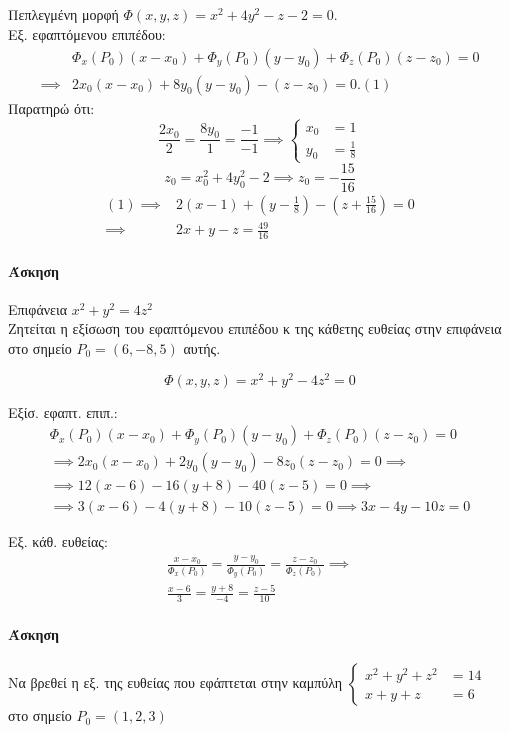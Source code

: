 \documentclass[11pt,a4paper,titlepage,draft]{article}
\begin{document}
\subparagraph{}
Πεπλεγμένη μορφή \( \Phi(x,y,z)=x^2+4y^2-z-2=0 \).\\
Εξ. εφαπτόμενου επιπέδου:
\begin{align*}
 & \Phi_x(P_0)(x-x_0)+\Phi_y(P_0)(y-y_0)+\Phi_z(P_0)(z-z_0) =0  \\
\implies & 2x_0(x-x_0) + 8y_0(y-y_0)-(z-z_0) = 0. (1)
\end{align*}
Παρατηρώ ότι: \[
\frac{2x_0}{2} = \frac{8y_0}{1} = \frac{-1}{-1} \implies \begin{cases}
x_0 &=1 \\ y_0 &= \frac{1}{8}
\end{cases}
\]
\[
z_0=x_0^2+4y_0^2-2 \implies z_0 = -\frac{15}{16}
\]
\begin{align*}
(1) \implies & 2(x-1)+\left( y-\frac{1}{8} \right) - \left(z+\frac{15}{16} \right) =0 \\
\implies & 2x+y-z=\frac{49}{16}
\end{align*}

\paragraph{Άσκηση}
Επιφάνεια \( x^2+y^2=4z^2 \)\\
Ζητείται η εξίσωση του εφαπτόμενου επιπέδου κ της κάθετης ευθείας στην επιφάνεια στο σημείο \( P_0=(6,-8,5) \) αυτής.

\[
\Phi(x,y,z)=x^2+y^2-4z^2=0
\]

Εξίσ. εφαπτ. επιπ.: \begin{align*}
\Phi_x(P_0)(x-x_0)+
\Phi_y(P_0)(y-y_0)+
\Phi_z(P_0)(z-z_0) = 0
\\
\implies 2x_0(x-x_0)+2y_0(y-y_0)-8z_0(z-z_0) = 0 \implies \\
\implies 12(x-6)-16(y+8)-40(z-5)=0 \implies \\
\implies 3(x-6) -4(y+8) -10(z-5)=0 \implies \boxed{3x-4y-10z=0}
\end{align*}

Εξ. κάθ. ευθείας: \begin{align*}
\frac{x-x_0}{\Phi_x(P_0)}
=\frac{y-y_0}{\Phi_y(P_0)}
=\frac{z-z_0}{\Phi_z(P_0)} \implies \\
\frac{x-6}{3} = \frac{y+8}{-4} = \frac{z-5}{10}
\end{align*}

\paragraph{Άσκηση}
Να βρεθεί η εξ. της ευθείας που εφάπτεται στην καμπύλη
\(
\begin{cases}
x^2+y^2+z^2 &=14 \\x+y+z &=6
\end{cases}
\) στο σημείο \( P_0=(1,2,3) \)
\end{document}
